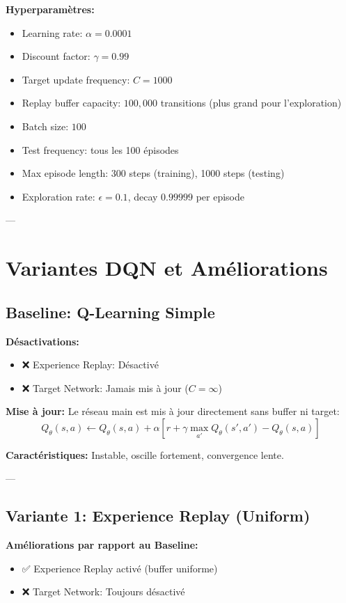 \textbf{Hyperparamètres:}
\begin{itemize}
    \item Learning rate: $\alpha = 0.0001$
    \item Discount factor: $\gamma = 0.99$
    \item Target update frequency: $C = 1000$
    \item Replay buffer capacity: $100,000$ transitions (plus grand pour l'exploration)
    \item Batch size: $100$
    \item Test frequency: tous les 100 épisodes
    \item Max episode length: 300 steps (training), 1000 steps (testing)
    \item Exploration rate: $\epsilon = 0.1$, decay $0.99999$ per episode
\end{itemize}

---

\section{Variantes DQN et Améliorations}

\subsection{Baseline: Q-Learning Simple}

\textbf{Désactivations:}
\begin{itemize}
    \item ❌ Experience Replay: Désactivé
    \item ❌ Target Network: Jamais mis à jour ($C = \infty$)
\end{itemize}

\textbf{Mise à jour:} Le réseau main est mis à jour directement sans buffer ni target:
\[
Q_\theta(s,a) \leftarrow Q_\theta(s,a) + \alpha [r + \gamma \max_{a'} Q_\theta(s', a') - Q_\theta(s,a)]
\]

\textbf{Caractéristiques:} Instable, oscille fortement, convergence lente.

---

\subsection{Variante 1: Experience Replay (Uniform)}

\textbf{Améliorations par rapport au Baseline:}
\begin{itemize}
    \item ✅ Experience Replay activé (buffer uniforme)
    \item ❌ Target Network: Toujours désactivé
\end{itemize}

